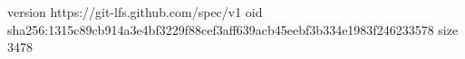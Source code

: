 version https://git-lfs.github.com/spec/v1
oid sha256:1315c89cb914a3e4bf3229f88cef3aff639acb45eebf3b334e1983f246233578
size 3478
